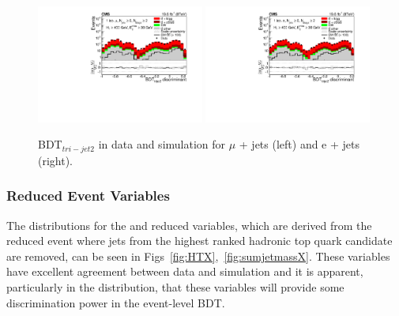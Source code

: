 \begin{figure}[!ht]
    \includegraphics[width=0.49\textwidth]{images/Run1/figures/MultiTopness_Mu.pdf}
    \includegraphics[width=0.49\textwidth]{images/Run1/figures/MultiTopness_e.pdf}
    \caption{BDT$_{tri-jet2}$ in data and simulation for $\mu$ + jets (left) and e + jets (right).}
    \label{fig:Multitopness}
\end{figure}

\subsubsection*{Reduced Event Variables}


The distributions for the \HTX and \sumjetmassX reduced variables, which are derived from the reduced event where jets from the highest ranked hadronic top quark candidate are removed, can be seen in Figs~\ref{fig:HTX},~\ref{fig:sumjetmassX}. These variables have excellent agreement between data and simulation and it is apparent, particularly in the \HTX distribution, that these variables will provide some discrimination power in the event-level BDT.

